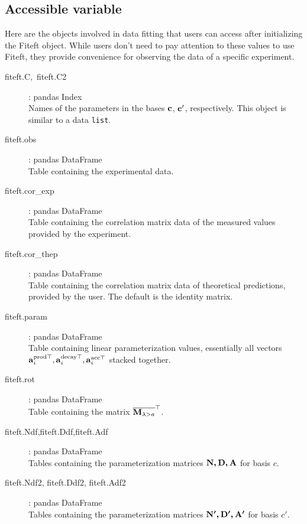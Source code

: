 \documentclass[12pt]{article}
\def\b#1{\boldsymbol{\rm #1}}
\begin{document}
\subsection{Accessible variable }
Here are the objects involved in data fitting that users can access after initializing the Fiteft object. While users don't need to pay attention to these values to use Fiteft, they provide convenience for observing the data of a specific experiment.
\begin{description}
  \item[fiteft.C,\ fiteft.C2]: pandas Index\\
  Names of the parameters in the bases $\b c$, $\b c'$, respectively. This object is similar to a data \verb|list|.
  \item[fiteft.obs]: pandas DataFrame\\
  Table containing the experimental data.
  \item[fiteft.cor\_exp]:  pandas DataFrame\\
  Table containing the correlation matrix data of the measured values provided by the experiment.
  \item[fiteft.cor\_thep]:  pandas DataFrame\\
  Table containing the correlation matrix data of theoretical predictions, provided by the user. The default is the identity matrix.
  \item[fiteft.param]:  pandas DataFrame\\
  Table containing linear parameterization values, essentially all vectors  $\b a_i^{\text{prod}\top},\b a_i^{\text{decay}\top},\b a_i^{\text{acc}\top}$ stacked together.
  \item[fiteft.rot] : pandas DataFrame\\
  Table containing the matrix $\overline{\b M_{\lambda >a}}^\top$.
  \item[fiteft.Ndf,fiteft.Ddf,fiteft.Adf] : pandas DataFrame\\
  Tables containing the parameterization matrices $\b{N,D,A}$ for basis $c$.
  \item[fiteft.Ndf2, fiteft.Ddf2, fiteft.Adf2] : pandas DataFrame\\
  Tables containing the parameterization matrices $\b{N',D',A'}$ for basis $c'$.
\end{description}
\end{document}
